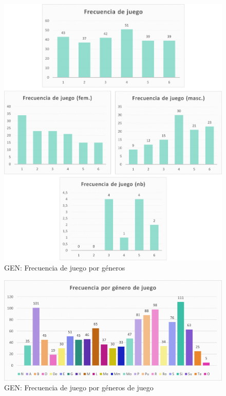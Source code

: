 \documentclass[12pt, a4paper,twoside,titlepage]{book}
\begin{document}
\begin{figure}
    \centering
    \includegraphics[width=1\linewidth]{ANEXO Gen/3AnexGENFrecALL}
    \caption{GEN: Frecuencia de juego por géneros}
    \label{fig:GENFrec}
\end{figure}



\begin{figure}
    \centering
    \includegraphics[width=1\linewidth]{ANEXO Gen/7AnexGENFrecgen}
    \caption{GEN: Frecuencia de juego por géneros de juego}
    \label{fig:GENFrecgen}
\end{figure}
\end{document}
